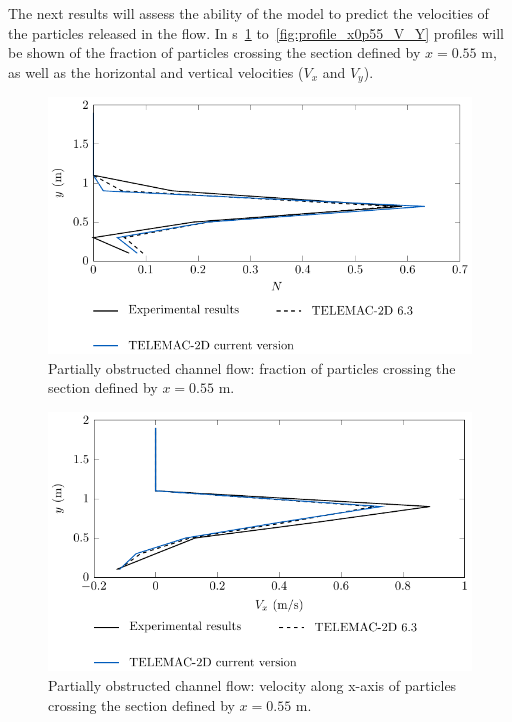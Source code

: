 The next results will assess the ability of the model to predict the velocities of the particles released in the flow. In
\figurename{}s~\ref{fig:profile_x0p55_N} to~\ref{fig:profile_x0p55_V_Y} profiles will be shown of the fraction of particles
crossing the section defined by $x=0.55$ m, as well as the horizontal and vertical velocities ($V_x$ and $V_y$).

\begin{figure}[h!]%
\begin{center}
%
  \includegraphics[]{./Figures/CanalAlgProfile_x0p55_N}
%
\end{center}
\caption{Partially obstructed channel flow: fraction of particles crossing the section defined by $x=0.55$ m.}
\label{fig:profile_x0p55_N}
\end{figure}

\begin{figure}[h!]%
\begin{center}
%
  \includegraphics[]{./Figures/CanalAlgProfile_x0p55_Vx}
%
\end{center}
\caption{Partially obstructed channel flow: velocity along x-axis of particles crossing the section defined by $x=0.55$ m.}
\label{fig:profile_x0p55_V_X}
\end{figure}

